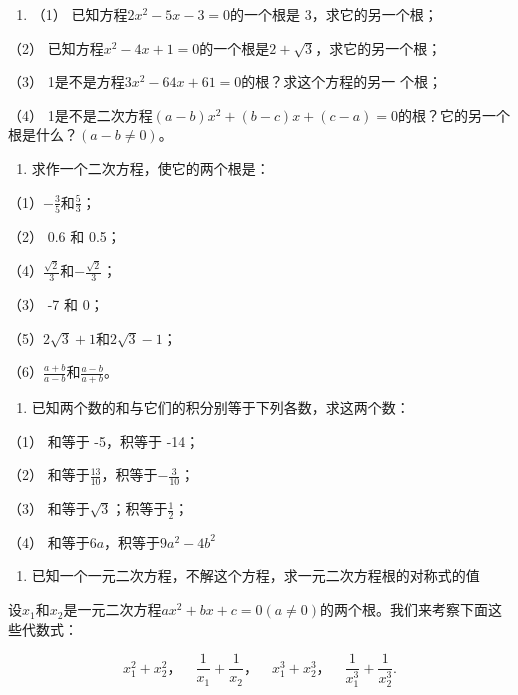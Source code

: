 \begin{enumerate}
\item
  （1） 已知方程\(2x^{2} - 5x - 3 = 0\)的一个根是 3，求它的另一个根；
\end{enumerate}

（2）
已知方程\(x^{2} - 4x + 1 = 0\)的一个根是\(2 + \sqrt{3}\)，求它的另一个根；

（3） 1是不是方程\(3x^{2} - 64x + 61 = 0\)的根？求这个方程的另一 个根；

（4）
1是不是二次方程\((a - b)x^{2} + (b - c)x + (c - a) = 0\)的根？它的另一个根是什么？\((a - b \neq 0)\)。

\begin{enumerate}[start=2]
\item
  求作一个二次方程，使它的两个根是：
\end{enumerate}

（1）\(-\frac{3}{5}\)和\(\frac{5}{3}\)；

（2） 0.6 和 0.5；

（4）\(\frac{\sqrt{2}}{3}\)和\(-\frac{\sqrt{2}}{3}\)；

（3） -7 和 0；

（5）\(2\sqrt{3} + 1\)和\(2\sqrt{3} - 1\)；

（6）\(\frac{a + b}{a - b}\)和\(\frac{a - b}{a + b}\)。

\begin{enumerate}[start=3]
\item
  已知两个数的和与它们的积分别等于下列各数，求这两个数：
\end{enumerate}

（1） 和等于 -5，积等于 -14；

（2） 和等于\(\frac{13}{10}\)，积等于\(-\frac{3}{10}\)；

（3） 和等于\(\sqrt{3}\)；积等于\(\frac{1}{2}\)；

（4） 和等于\(6a\)，积等于\(9a^{2}-4b^{2}\)

\begin{enumerate}[start=4]
\item
  已知一个一元二次方程，不解这个方程，求一元二次方程根的对称式的值
\end{enumerate}

设\(x_{1}\)和\(x_{2}\)是一元二次方程\(ax^{2} + bx + c = 0 (a \neq 0)\)的两个根。我们来考察下面这些代数式：

\[
x _ {1} ^ {2} + x _ {2} ^ {2}\text{，} \quad \frac{1}{x _ {1}} + \frac{1}{x _ {2}}\text{，} \quad x _ {1} ^ {3} + x _ {2} ^ {3}\text{，} \quad \frac{1}{x _ {1} ^ {3}} + \frac{1}{x _ {2} ^ {3}}.
\]

